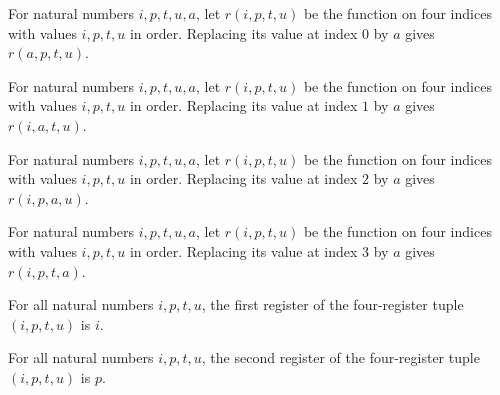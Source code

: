 \begin{lemma}
\label{Complexity.LogProg.WidthExample.rf_upd0}
\leanok
{}
For natural numbers $i,p,t,u,a$, let $r(i,p,t,u)$ be the function on four indices with
values $i,p,t,u$ in order. Replacing its value at index $0$ by $a$ gives $r(a,p,t,u)$.
\end{lemma}

\begin{lemma}
\label{Complexity.LogProg.WidthExample.rf_upd1}
\leanok
{}
For natural numbers $i,p,t,u,a$, let $r(i,p,t,u)$ be the function on four indices with
values $i,p,t,u$ in order. Replacing its value at index $1$ by $a$ gives $r(i,a,t,u)$.
\end{lemma}

\begin{lemma}
\label{Complexity.LogProg.WidthExample.rf_upd2}
\leanok
{}
For natural numbers $i,p,t,u,a$, let $r(i,p,t,u)$ be the function on four indices with
values $i,p,t,u$ in order. Replacing its value at index $2$ by $a$ gives $r(i,p,a,u)$.
\end{lemma}

\begin{lemma}
\label{Complexity.LogProg.WidthExample.rf_upd3}
\leanok
{}
For natural numbers $i,p,t,u,a$, let $r(i,p,t,u)$ be the function on four indices with
values $i,p,t,u$ in order. Replacing its value at index $3$ by $a$ gives $r(i,p,t,a)$.
\end{lemma}

\begin{lemma}
\label{Complexity.LogProg.WidthExample.rf_0}
\leanok
{}
For all natural numbers $i,p,t,u$, the first register of the four-register tuple
$(i,p,t,u)$ is $i$.
\end{lemma}

\begin{lemma}
\label{Complexity.LogProg.WidthExample.rf_1}
\leanok
{}
For all natural numbers $i,p,t,u$, the second register of the four-register tuple
$(i,p,t,u)$ is $p$.
\end{lemma}

